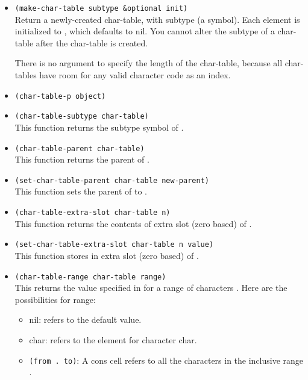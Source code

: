 \begin{itemize}
\item \lstinline|(make-char-table subtype &optional init)|\\
  Return a newly-created char-table, with subtype  (a symbol).
  Each element is initialized to , which defaults to nil.
  You cannot alter the subtype of a char-table after the char-table is created.

  There is no argument to specify the length of the char-table, because all char-tables have room for any valid character code as an index.

  
\item \lstinline|(char-table-p object)|
  
\item \lstinline|(char-table-subtype char-table)|\\
  This function returns the subtype symbol of .
\item \lstinline|(char-table-parent char-table)|\\
  This function returns the parent of .
\item \lstinline|(set-char-table-parent char-table new-parent)|\\
  This function sets the parent of  to .
\item \lstinline|(char-table-extra-slot char-table n)|\\
  This function returns the contents of extra slot  (zero based) of .
\item \lstinline|(set-char-table-extra-slot char-table n value)|\\
  This function stores  in extra slot  (zero based) of .
\item \lstinline|(char-table-range char-table range)|\\
  This returns the value specified in  for a range of characters .
  Here are the possibilities for range:
  \begin{itemize}
  \item nil: refers to the default value.
  \item char: refers to the element for character char.
  \item \lstinline|(from . to)|: A cons cell refers to all the characters in the inclusive range \argument{[from to]}.
  \end{itemize}

\end{itemize}
